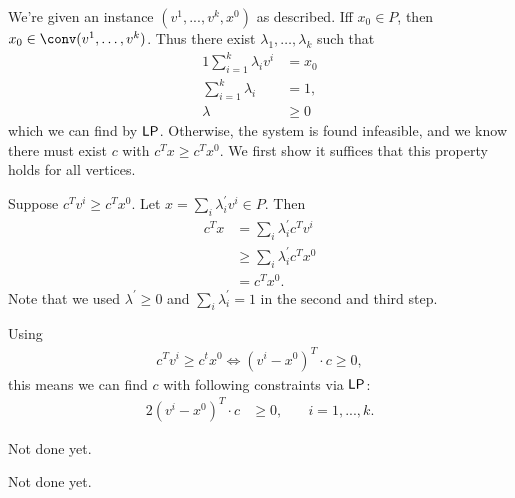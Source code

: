 \begin{aufgabe} \label{ex:4.1}
    We're given an instance $(v^1,...,v^k,x^0)$ as described. Iff $x_0 \in P$,
    then $x_0 \in \conv(v^1,\dots,v^k)$. Thus there exist $\lambda_1,\dots,\lambda_k$ such that
    \begin{alignat*}{1}
        \sum_{i=1}^k\lambda_i v^i & = x_0  \\
        \sum_{i=1}^k\lambda_i     & =1,    \\
        \lambda                   & \geq 0
    \end{alignat*}
    which we can find by $\mathsf{LP}$. Otherwise, the system is found infeasible, and we know there must
    exist $c$ with $c^Tx \geq c^Tx^0$. We first show it suffices that this property holds for all vertices.

    Suppose $c^Tv^i \geq c^Tx^0$. Let $x = \sum_i \lambda^\prime_i v^i \in P$. Then
    \begin{align*}
        c^Tx & = \sum_i \lambda^\prime_i c^T v^i   \\
             & \geq \sum_i \lambda^\prime_i c^Tx^0 \\
             & = c^Tx^0.
    \end{align*}
    Note that we used $\lambda^\prime \geq 0$ and $\sum_i \lambda^\prime_i =1$ in the second and third step.

    Using
    \begin{align*}
        c^Tv^i \geq c^tx^0 \Leftrightarrow (v^i - x^0)^T \cdot c \geq 0,
    \end{align*}
    this means we can find $c$ with following constraints via $\mathsf{LP}$:
    \begin{alignat*}{2}
        (v^i - x^0)^T \cdot c & \geq 0, & \quad i = 1,...,k.
    \end{alignat*}
\end{aufgabe}
\begin{aufgabe}
 Not done yet.
\end{aufgabe}
\begin{aufgabe}
 Not done yet.
\end{aufgabe}